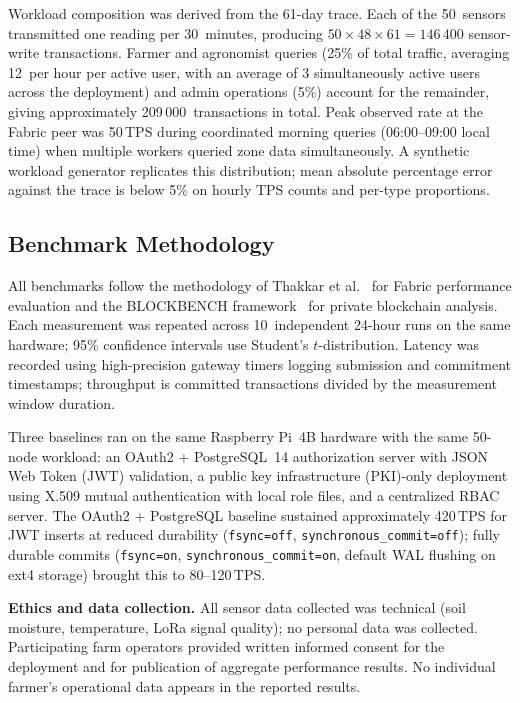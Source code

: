\documentclass[a4paper,fleqn]{cas-dc}
\begin{document}
Workload composition was derived from the 61-day trace. Each of the
50~sensors transmitted one reading per 30~minutes, producing
$50 \times 48 \times 61 = 146\,400$ sensor-write transactions. Farmer
and agronomist queries (25\% of total traffic, averaging 12~per hour
per active user, with an average of 3 simultaneously active users
across the deployment) and admin operations (5\%) account for the
remainder, giving approximately 209\,000~transactions in total. Peak
observed rate at the Fabric peer was 50\,TPS during coordinated morning
queries (06:00--09:00 local time) when multiple workers queried zone
data simultaneously. A synthetic workload generator replicates this
distribution; mean absolute percentage error against the trace is
below 5\% on hourly TPS counts and per-type proportions.

\subsection{Benchmark Methodology}
\label{subsec:bench}

All benchmarks follow the methodology of Thakkar et
al.~\cite{thakkar2018performance} for Fabric performance evaluation
and the BLOCKBENCH framework~\cite{dinh2017blockbench} for private
blockchain analysis. Each measurement was repeated across 10~independent
24-hour runs on the same hardware; 95\% confidence intervals use
Student's $t$-distribution. Latency was recorded using high-precision
gateway timers logging submission and commitment timestamps; throughput
is committed transactions divided by the measurement window duration.

Three baselines ran on the same Raspberry Pi~4B hardware with the same
50-node workload: an OAuth2 + PostgreSQL~14 authorization server with
JSON Web Token (JWT) validation, a public key infrastructure
(PKI)-only deployment using X.509 mutual authentication with local role
files, and a centralized RBAC server. The OAuth2 +
PostgreSQL baseline sustained approximately 420\,TPS for JWT inserts
at reduced durability (\texttt{fsync=off},
\texttt{synchronous\_commit=off}); fully durable commits
(\texttt{fsync=on}, \texttt{synchronous\_commit=on}, default WAL
flushing on ext4 storage) brought this to 80--120\,TPS.

\noindent\textbf{Ethics and data collection.} All sensor data collected
was technical (soil moisture, temperature, LoRa signal quality); no
personal data was collected. Participating farm operators provided
written informed consent for the deployment and for publication of
aggregate performance results. No individual farmer's operational data
appears in the reported results.
\end{document}
